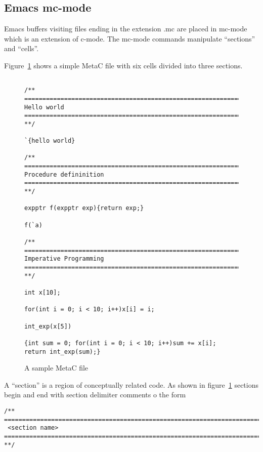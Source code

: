 \documentclass{article}
\begin{document}
\subsection{Emacs mc-mode}

Emacs buffers visiting files ending in the extension .mc are placed
in mc-mode which is an extension of c-mode.  The mc-mode commands
manipulate ``sections'' and ``cells''.

Figure~\ref{fig:sample-file} shows a simple MetaC file with six cells divided into three sections.

\begin{figure}

{\small
\begin{verbatim}

/** ========================================================================
Hello world
======================================================================== **/

`{hello world}

/** ========================================================================
Procedure defininition
======================================================================== **/

expptr f(expptr exp){return exp;}

f(`a)

/** ========================================================================
Imperative Programming
======================================================================== **/

int x[10];

for(int i = 0; i < 10; i++)x[i] = i;

int_exp(x[5])

{int sum = 0; for(int i = 0; i < 10; i++)sum += x[i]; return int_exp(sum);}
\end{verbatim}
}
\caption{A sample MetaC file}
\label{fig:sample-file}
\end{figure}
  
\noindent A ``section'' is a region of conceptually related code.  As shown in figure~\ref{fig:sample-file}
sections begin and end with
section delimiter comments o the form

\begin{verbatim}
/** ========================================================================
 <section name>
======================================================================== **/
\end{verbatim}
\end{document}
